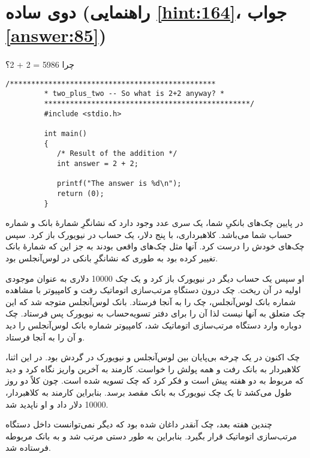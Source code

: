 \section[دوی ساده]{دوی ساده \protect{} (راهنمایی \ref{hint:164}، جواب \ref{answer:85})}
\paragraph{}\label{prog:70}
چرا 5986 = 2 + 2؟

\begin{LTR}
    \begin{lstlisting}[style=C++Style]
         /************************************************
         * two_plus_two -- So what is 2+2 anyway? *
         ************************************************/
         #include <stdio.h>

         int main()
         {
         	/* Result of the addition */
         	int answer = 2 + 2;

         	printf("The answer is %d\n");
         	return (0);
         }
    \end{lstlisting}
\end{LTR}

\begin{tcolorbox}
    در پایین چک‌های بانکیِ شما، یک سری عدد وجود دارد که نشانگرِ شمارهٔ بانک و شماره حساب شما می‌باشد. کلاهبرداری، با پنج دلار، یک حساب در نیویورک باز کرد. سپس چک‌های خودش را درست کرد. آنها مثل چک‌های واقعی بودند به جز این که شمارهٔ بانک تغییر کرده بود به طوری که نشانگرِ بانکی در لوس‌آنجلس بود.

    او سپس یک حساب دیگر در نیویورک باز کرد و یک چک 10000 دلاری به عنوان موجودی اولیه در آن ریخت. چک درون دستگاهِ مرتب‌سازی اتوماتیک رفت و کامپیوتر با مشاهده شماره بانک لوس‌آنجلس، چک را به آنجا فرستاد. بانک لوس‌آنجلس متوجه شد که این چک متعلق به آنها نیست لذا آن را برای دفتر تسویه‌حساب به نیویورک پس فرستاد. چک دوباره وارد دستگاه مرتب‌سازی اتوماتیک شد، کامپیوتر شماره بانک لوس‌آنجلس را دید و آن را به آنجا فرستاد.

    چک اکنون در یک چرخه بی‌پایان بین لوس‌آنجلس و نیویورک در گردش بود. در این اثنا، کلاهبردار به بانک رفت و همه پولش را خواست. کارمند به آخرین واریز نگاه کرد و دید که مربوط به دو هفته پیش است و فکر کرد که چک تسویه شده است. چون کلاً دو روز طول می‌کشد تا یک چک نیویورک به بانک مقصد برسد. بنابراین کارمند به کلاهبردار، 10000 دلار داد و او ناپدید شد.

    چندین هفته بعد، چک آنقدر داغان شده بود که دیگر نمی‌توانست داخل دستگاه مرتب‌سازی اتوماتیک قرار بگیرد. بنابراین به طور دستی مرتب شد و به بانک مربوطه فرستاده شد.
\end{tcolorbox}